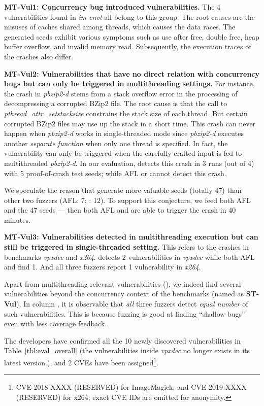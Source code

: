 \textbf{MT-Vul1: Concurrency bug introduced vulnerabilities.} 
The 4 vulnerabilities found in \emph{im-cnvt} all belong to this group. The root causes are the misuses of caches shared among threads, which causes the data races. The generated seeds  exhibit various symptoms such as use after free, double free, heap buffer overflow, and 
invalid memory read. Subsequently, the execution traces of the crashes also differ.

\textbf{MT-Vul2: Vulnerabilities that have no direct relation with concurrency bugs but can only be triggered in multithreading settings.}
For instance, the crash in \emph{pbzip2-d} stems from a stack overflow error in the processing of decompressing a corrupted BZip2 file. The root cause is that the call to \emph{pthread\_attr\_setstacksize} constrains the 
stack size of each thread. But certain corrupted BZip2 files may use up the stack in a short
time. This crash can never happen when \emph{pbzip2-d} works in single-threaded mode since \emph{pbzip2-d} executes another \emph{separate function} when only one thread is specified.  In fact, the vulnerability can only be triggered when the carefully crafted input is fed to
multithreaded \emph{pbzip2-d}. In our evaluation, \mtfuzz detects this crash in 3 runs (out of 4) 
with 5 proof-of-crash test seeds; while AFL or \mtfuzzc cannot detect this crash. 

We speculate the reason that \mtfuzz generate more valuable seeds (totally 47) than other two 
fuzzers (AFL: 7; \mtfuzzc: 12). To support this conjecture, we feed both AFL and \mtfuzzc the 47 
\mtfuzz seeds --- then both AFL and \mtfuzzc are able to trigger the crash in 40 minutes.


\textbf{MT-Vul3: Vulnerabilities detected in multithreading execution but can still be triggered 
in single-threaded setting.} This refers to the crashes in benchmarks \emph{vpxdec} and \emph{x264}. 
\mtfuzz detects 2 vulnerabilities in \emph{vpxdec} while both AFL and \mtfuzzc find 1. And all three
fuzzers report 1 vulnerability in \emph{x264}.

Apart from multithreading relevant vulnerabilities (\vulsMT), we indeed find several vulnerabilities beyond the concurrency context of the benchmarks (named as \textbf{ST-Vul}). In column \vulsST, it is observable 
that \emph{all} three fuzzers detect \emph{equal number} of such vulnerabilities. 
This is because fuzzing is good at finding ``shallow bugs''~\cite{driller} even with less coverage 
feedback.

The developers have confirmed all the 10 newly discovered vulnerabilities in Table~\ref{tbl:eval_overall} (the vulnerabilities inside \emph{vpxdec} no longer exists in its latest version.), 
and 2 CVEs have been assigned\footnote{CVE-2018-XXXX (RESERVED) for ImageMagick, and CVE-2019-XXXX (RESERVED) for x264; exact CVE IDs are omitted for anonymity.}.


